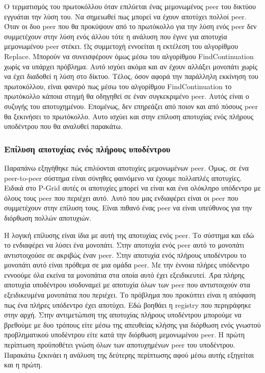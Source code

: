 Ο τερματισμός του πρωτοκόλλου όταν επιλύεται ένας μεμονωμένος peer του 
δικτύου εγγυάται την λύση του. Να σημειωθεί πως μπορεί να έχουν αποτύχει 
πολλοί peer. Όταν οι δυο peer που θα προκύψουν από το πρωτόκολλο για την λύση 
ενός peer δεν συμμετέχουν στην λύση ενός άλλου τότε η ανάλυση που έγινε για 
αποτυχία μεμονωμένου peer στέκει. Ως συμμετοχή εννοείται η εκτέλεση του 
αλγορίθμου Replace. Μπορούν να συνεισφέρουν όμως μέσω του αλγορίθμου 
FindContinuation χωρίς να υπάρχει πρόβλημα. Αυτό ισχύει ακόμα και αν έχουν 
αλλάξει μονοπάτι χωρίς να έχει διαδοθεί η λύση στο δίκτυο.
Τέλος, όσον αφορά την παράλληλη εκκίνηση του πρωτοκόλλου, είναι φανερό πως 
μέσω του αλγορίθμου FindContinuation το πρωτόκολλο κάποια στιγμή θα οδηγηθεί 
σε έναν συγκεκριμένο peer. Αυτός είναι ο συζυγής του αποτυχημένου. Επομένως, 
δεν επηρεάζει από ποιον και από πόσους peer θα ξεκινήσει το πρωτόκολλο. Αυτο 
ισχύει και στην επίλυση αποτυχίας ενός πλήρους υποδέντρου που θα αναλυθεί 
παρακάτω.

\subsubsection{Επίλυση αποτυχίας ενός πλήρους υποδέντρου}

Παραπάνω εξηγήθηκε πώς επιλύονται αποτυχίες μεμονωμένων peer. Όμως, σε ένα 
peer-to-peer σύστημα είναι σύνηθες φαινόμενο να έχουμε πολλαπλές αποτυχίες. 
Ειδικά στο P-Grid αυτές οι αποτυχίες μπορεί να είναι και ένα ολόκληρο 
υπόδεντρο με όλους τους peer που περιέχει αυτό. Αυτό που μας ενδιαφέρει 
είναι οι peer που συμμετέχουν στην επίλυση τους. Είναι πιθανό ένας peer να 
είναι υπεύθυνος για την διόρθωση πολλών αποτυχιών.

Η λογική επίλυσης είναι ίδια με αυτή της αποτυχίας ενός peer. Το σύστημα και 
εδώ το ενδιαφέρει να λύσει ένα μονοπάτι. Στην αποτυχία ενός peer αυτό το 
μονοπάτι αντιστοιχούσε σε ακριβώς έναν peer. Στην αποτυχία ενός πλήρους 
υποδέντρου το μονοπάτι αυτό είναι πρόθεμα σε μια ομάδα peer. Με την έννοια 
πλήρες υπόδεντρο εννοούμε όλα εκείνα τα μονοπάτια στα οποία αυτό έχει εξειδικευτεί. 
Άρα πλήρης αποτυχία υποδέντρου ισοδυναμεί με αποτυχία όλων των peer που 
αντιστοιχούν στα εξειδικευμένα μονοπάτια που περιέχει.
Το πρόβλημα που προκύπτει είναι η απόφαση πως ένα πλήρες υπόδεντρο έχει 
αποτύχει. Εδώ βοηθάει η registry που περιγράφηκε στην αρχή. Στην αντιμετώπιση 
της αποτυχίας πλήρους υποδέντρου μπορούμε να βρεθούμε με δυο τρόπους είτε 
μέσω της απευθείας κλήσης για διόρθωση ενός γνωστού προβληματικού υποδέντρου 
είτε κατά την διόρθωση μεμονωμένου peer. Η πρώτη περίπτωση προϋποθέτει 
γνώση όλων των αποτυχημένων peer του υποδέντρου. Παρακάτω ξεκινάει η ανάλυση 
της δεύτερης περίπτωσης αφού μέσω αυτής εξηγείται και η πρώτη.


